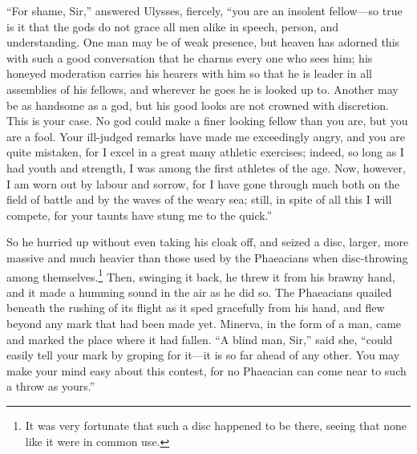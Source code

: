 “For shame, Sir,” answered Ulysses, fiercely, “you are an insolent fellow—so
true is it that the gods do not grace all men alike in speech, person, and
understanding. One man may be of weak presence, but heaven has adorned this
with such a good conversation that he charms every one who sees him; his
honeyed moderation carries his hearers with him so that he is leader in all
assemblies of his fellows, and wherever he goes he is looked up to. Another may
be as handsome as a god, but his good looks are not crowned with discretion.
This is your case. No god could make a finer looking fellow than you are, but
you are a fool. Your ill-judged remarks have made me exceedingly angry, and you
are quite mistaken, for I excel in a great many athletic exercises; indeed, so
long as I had youth and strength, I was among the first athletes of the age.
Now, however, I am worn out by labour and sorrow, for I have gone through much
both on the field of battle and by the waves of the weary sea; still, in spite
of all this I will compete, for your taunts have stung me to the quick.”

So he hurried up without even taking his cloak off, and seized a disc, larger,
more massive and much heavier than those used by the Phaeacians when
disc-throwing among themselves.\footnote{It was very fortunate that such a disc happened to be there, seeing that
none like it were in common use.} Then, swinging it back, he threw it
from his brawny hand, and it made a humming sound in the air as he did so. The
Phaeacians quailed beneath the rushing of its flight as it sped gracefully from
his hand, and flew beyond any mark that had been made yet. Minerva, in the form
of a man, came and marked the place where it had fallen. “A blind man, Sir,”
said she, “could easily tell your mark by groping for it—it is so far ahead of
any other. You may make your mind easy about this contest, for no Phaeacian can
come near to such a throw as yours.”

